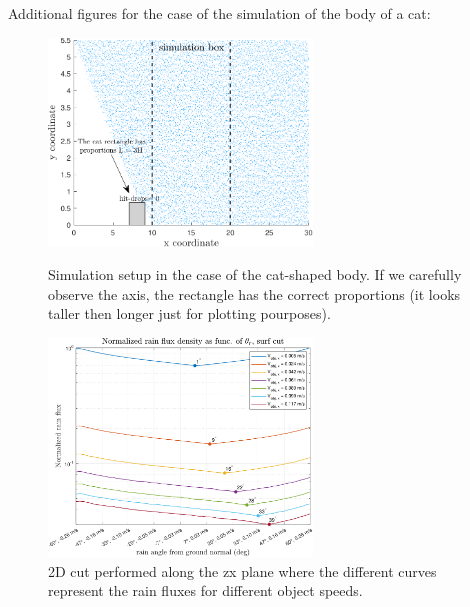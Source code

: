 \documentclass[12pt]{report}
\begin{document}
            \newpage
            Additional figures for the case of the simulation of the body of a cat:
            \vspace{-10pt}
            \begin{figure}[H]
                \centering
                \includegraphics[width=0.625\textwidth]{images/sim_cat.pdf}
                \caption{Simulation setup in the case of the cat-shaped body. If we carefully observe the axis, the rectangle has the correct proportions (it looks taller then longer just for plotting pourposes).}
                \hspace{-5pt}
                \includegraphics[width=0.625\textwidth]{images/cat/rain_flux_theta_min_cat.pdf}
                \caption{2D cut performed along the zx plane where the different curves represent the rain fluxes for different object speeds.}
            \end{figure}
\end{document}
